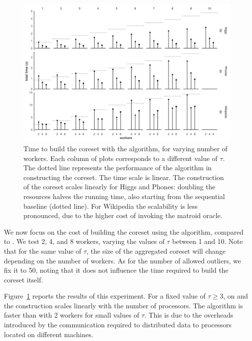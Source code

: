 \begin{figure}
    \includegraphics[width=\textwidth]{mr-time}
    \caption{
        \label{fig:mr-coreset-time}
        Time to build the coreset with the \mapr algorithm, for varying number of workers.
        Each column of plots corresponds to a different value of $\tau$.
        The dotted line represents the performance of the \seq algorithm in constructing the coreset.
        The time scale is linear.
        The construction of the coreset scales linearly for Higgs and Phones: doubling 
        the resources halves the running time, also starting from the sequential baseline 
        (dotted line). For Wikipedia the scalability is 
        less pronounced, due to the higher cost of invoking the matroid oracle.
    }
\end{figure}

We now focus on the cost of building the coreset using the \mapr algorithm, compared to \seq.
We test 2, 4, and 8 workers, varying the values of $\tau$ between 1 and 10. Note that for the same value
of $\tau$, the size of the aggregated coreset will change depending on the number of workers.
As for the number of allowed outliers, we fix it to 50, noting that it does not influence the 
time required to build the coreset itself.

Figure~\ref{fig:mr-coreset-time} reports the results of this experiment. 
For a fixed value of $\tau \ge 3$, on \higgs and \phones the \mapr construction scales linearly with the 
number of processors. 
The \seq algorithm is faster than \mapr with 2 workers for small values of $\tau$. 
This is due to the overheads introduced by the communication required to distributed data to
processors located on different machines.

